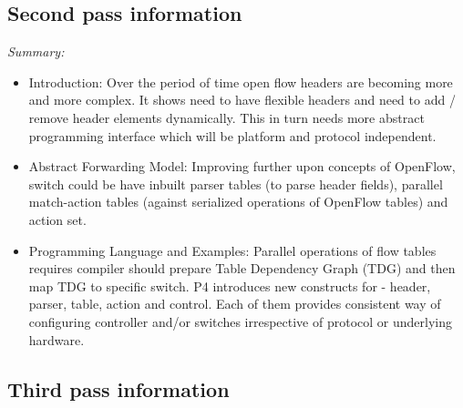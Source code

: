 \documentclass[letterpaper,twocolumn,10pt]{article}
\begin{document}
\subsection{Second pass information}
\label{sec:second}



{\it Summary:} 

\begin{itemize}
\item Introduction: Over the period of time open flow headers are becoming more and more complex. It shows need to have flexible headers and need to add / remove header elements dynamically. This in turn needs more abstract programming interface which will be platform and protocol independent.

\item Abstract Forwarding Model: Improving further upon concepts of OpenFlow, switch could be have inbuilt parser tables (to parse header fields), parallel match-action tables (against serialized operations of OpenFlow tables) and action set.

\item Programming Language and Examples: Parallel operations of flow tables requires compiler should prepare Table Dependency Graph (TDG) and then map TDG to specific switch. P4 introduces new constructs for - header, parser, table, action and control. Each of them provides consistent way of configuring controller and/or switches irrespective of protocol or underlying hardware.

\end{itemize}

\subsection{Third pass information}
\label{sec:third}
\end{document}
